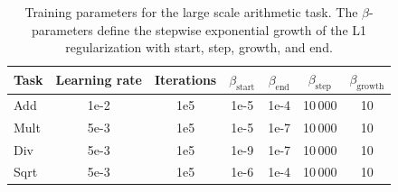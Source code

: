 \documentclass[9pt]{article}
\begin{document}
\begin{table}[h]
  \centering
  \caption{Training parameters for the large scale arithmetic task. The
  $\beta$-parameters define the stepwise exponential growth of the L1
  regularization with start, step, growth, and end.}
  \label{tab:training_large_scale}
  \begin{tabular}{lcccccc}
    \toprule
    Task & Learning rate & Iterations & $\beta_{\text{start}}$ &
      $\beta_{\text{end}}$ & $\beta_{\text{step}}$  & $\beta_{\text{growth}}$ \\
    \midrule
    Add  & 1e-2 & 1e5 & 1e-5 & 1e-4 & 10\,000 & 10 \\
    Mult & 5e-3 & 1e5 & 1e-5 & 1e-7 & 10\,000 & 10 \\
    Div  & 5e-3 & 1e5 & 1e-9 & 1e-7 & 10\,000 & 10 \\
    Sqrt & 5e-3 & 1e5 & 1e-6 & 1e-4 & 10\,000 & 10 \\
    \bottomrule
  \end{tabular}
\end{table}
\end{document}
